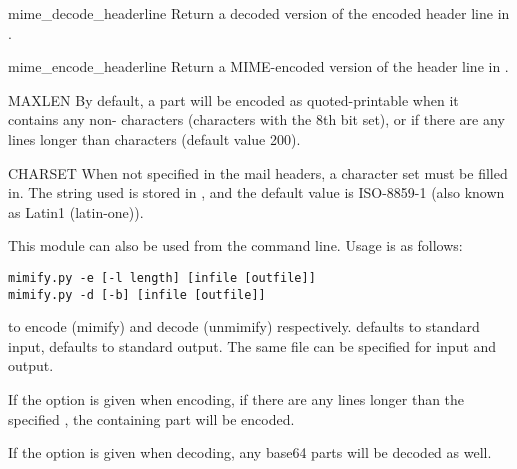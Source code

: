 \begin{funcdesc}{mime_decode_header}{line}
Return a decoded version of the encoded header line in .
\end{funcdesc}

\begin{funcdesc}{mime_encode_header}{line}
Return a MIME-encoded version of the header line in .
\end{funcdesc}

\begin{datadesc}{MAXLEN}
By default, a part will be encoded as quoted-printable when it
contains any non-\ASCII{} characters (characters with the 8th bit
set), or if there are any lines longer than  characters
(default value 200).  
\end{datadesc}

\begin{datadesc}{CHARSET}
When not specified in the mail headers, a character set must be filled
in.  The string used is stored in , and the default
value is ISO-8859-1 (also known as Latin1 (latin-one)).
\end{datadesc}

This module can also be used from the command line.  Usage is as
follows:
\begin{verbatim}
mimify.py -e [-l length] [infile [outfile]]
mimify.py -d [-b] [infile [outfile]]
\end{verbatim}
to encode (mimify) and decode (unmimify) respectively.  
defaults to standard input,  defaults to standard output.
The same file can be specified for input and output.

If the  option is given when encoding, if there are any lines
longer than the specified , the containing part will be
encoded.

If the  option is given when decoding, any base64 parts will
be decoded as well.

\begin{seealso}
\end{seealso}
